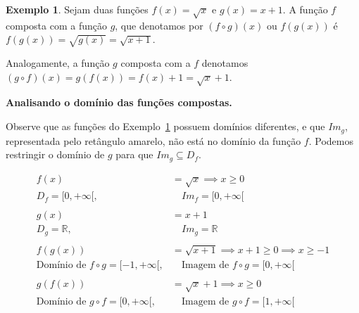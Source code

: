 \documentclass[12pt,openright,twoside,a4paper]{article}
\theoremstyle{definition}
\newtheorem{example}{Exemplo}[section]
\begin{document}
	\begin{example}\label{ex:funcoes_compostas} Sejam duas funções $f(x) = \sqrt{x}$ e $g(x) = x + 1$. A função $f$ composta com a função $g$, que denotamos por $(f \circ g)(x)$ ou $f(g(x))$ é $f(g(x)) = \sqrt{g(x)} = \sqrt{x+1}$.
	
	Analogamente, a função $g$ composta com a $f$ denotamos $(g \circ f)(x) = g(f(x)) = f(x) + 1 = \sqrt{x} + 1$.
	
	\end{example}	
	
	\textbf{Analisando o domínio das funções compostas.}
	
	Observe que as funções do Exemplo~\ref{ex:funcoes_compostas} possuem domínios diferentes, e que $Im_g$, representada pelo retângulo amarelo, não está no domínio da função $f$. Podemos restringir o domínio de $g$ para que $Im_g \subseteq D_f$.
	
	\begin{align*}
		f(x) &= \sqrt{x} \implies x \geq 0\\
		D_f = [0, + \infty[,& \quad Im_f = [0, + \infty[\\
		\\
		g(x) &= x + 1\\
		D_g = \mathbb{R},& \quad Im_g = \mathbb{R}\\
		\\
		f(g(x)) &= \sqrt{x + 1} \implies x + 1 \geq 0 \implies x \geq -1\\
		\text{Domínio de } f \circ g = [-1, + \infty[,& \quad \text{Imagem de } f \circ g = [0, + \infty[\\
		\\
		g(f(x)) &= \sqrt{x} + 1 \implies x \geq 0\\
		\text{Domínio de } g \circ f = [0, + \infty[,& \quad \text{Imagem de } g \circ f = [1, + \infty[
	\end{align*}
	
\end{document}
